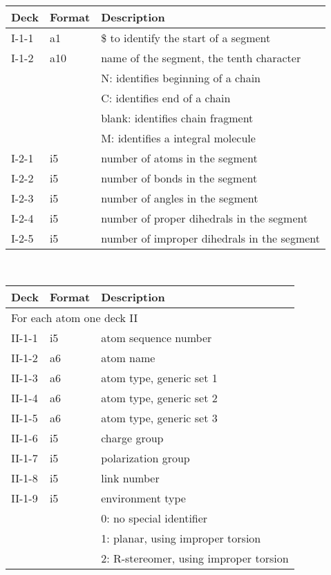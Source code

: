 \begin{center}
\begin{tabular*}{150mm}{p{12mm}p{12mm}l}
\hline\hline
Deck  & Format & Description \\ \hline
I-1-1 & a1     & \$ to identify the start of a segment \\ %
I-1-2 & a10    & name of the segment, the tenth character\\
      &        & N: identifies beginning of a chain\\
      &        & C: identifies end of a chain\\
      &        & blank: identifies chain fragment\\
      &        & M: identifies a integral molecule\\
I-2-1 & i5     & number of atoms in the segment\\
I-2-2 & i5     & number of bonds in the segment\\
I-2-3 & i5     & number of angles in the segment\\
I-2-4 & i5     & number of proper dihedrals in the segment\\
I-2-5 & i5     & number of improper dihedrals in the segment\\
\hline
\end{tabular*}\\
\begin{tabular*}{150mm}{p{12mm}p{12mm}l}
\hline\hline
Deck & Format & Description \\ \hline
\multicolumn{3}{l}{For each atom one deck II} \\
II-1-1 & i5     & atom sequence number \\
II-1-2 & a6     & atom name \\
II-1-3 & a6     & atom type, generic set 1 \\
II-1-4 & a6     & atom type, generic set 2 \\
II-1-5 & a6     & atom type, generic set 3 \\
II-1-6 & i5     & charge group\\
II-1-7 & i5     & polarization group\\
II-1-8 & i5     & link number\\
II-1-9 & i5     & environment type\\
       &        & 0: no special identifier\\
       &        & 1: planar, using improper torsion\\
       &        & 2: R-stereomer, using improper torsion\\

\end{tabular*}
\end{center}
